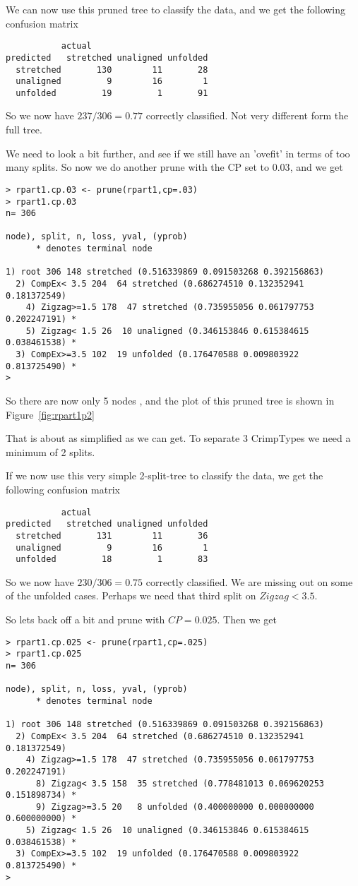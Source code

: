 \documentclass[titlepage]{article}  %
\begin{document}
We can now use this pruned tree to classify the data, and we get the following confusion matrix
\begin{verbatim}
           actual
predicted   stretched unaligned unfolded
  stretched       130        11       28
  unaligned         9        16        1
  unfolded         19         1       91
\end{verbatim}
So we now have $237/306 = 0.77$ correctly classified. Not very different form the full tree.

We need to look a bit further, and see if we still have an 'ovefit' in terms of too many splits. So now we do another prune with the CP set to $0.03$, and we get
\begin{verbatim}
> rpart1.cp.03 <- prune(rpart1,cp=.03)
> rpart1.cp.03
n= 306 

node), split, n, loss, yval, (yprob)
      * denotes terminal node

1) root 306 148 stretched (0.516339869 0.091503268 0.392156863)  
  2) CompEx< 3.5 204  64 stretched (0.686274510 0.132352941 0.181372549)  
    4) Zigzag>=1.5 178  47 stretched (0.735955056 0.061797753 0.202247191) *
    5) Zigzag< 1.5 26  10 unaligned (0.346153846 0.615384615 0.038461538) *
  3) CompEx>=3.5 102  19 unfolded (0.176470588 0.009803922 0.813725490) *
> 
\end{verbatim}
 So there are now only 5 nodes , and the plot of this pruned tree is shown in Figure~\ref{fig:rpart1p2}

That is about as simplified as we can get. To separate 3 CrimpTypes we need a minimum of 2 splits.

If we now use this  very simple 2-split-tree to classify the data, we get the following confusion matrix
\begin{verbatim}
           actual
predicted   stretched unaligned unfolded
  stretched       131        11       36
  unaligned         9        16        1
  unfolded         18         1       83
\end{verbatim}
So we now have $230/306=0.75$ correctly classified. We are missing out on some of the unfolded cases. Perhaps we need that third split on $Zigzag < 3.5$.

So lets back off a bit and prune with $CP=0.025$. Then we get
\begin{verbatim}
> rpart1.cp.025 <- prune(rpart1,cp=.025)
> rpart1.cp.025
n= 306 

node), split, n, loss, yval, (yprob)
      * denotes terminal node

1) root 306 148 stretched (0.516339869 0.091503268 0.392156863)  
  2) CompEx< 3.5 204  64 stretched (0.686274510 0.132352941 0.181372549)  
    4) Zigzag>=1.5 178  47 stretched (0.735955056 0.061797753 0.202247191)  
      8) Zigzag< 3.5 158  35 stretched (0.778481013 0.069620253 0.151898734) *
      9) Zigzag>=3.5 20   8 unfolded (0.400000000 0.000000000 0.600000000) *
    5) Zigzag< 1.5 26  10 unaligned (0.346153846 0.615384615 0.038461538) *
  3) CompEx>=3.5 102  19 unfolded (0.176470588 0.009803922 0.813725490) *
> 
\end{verbatim}
\end{document}
